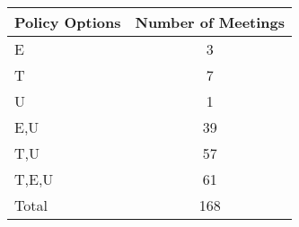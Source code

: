 \begin{tabular}{lc}
\hline\hline 
\addlinespace 
Policy Options & Number of Meetings \\ 
\hline 
E & 3 \\
T & 7 \\
U & 1 \\
E,U & 39 \\
T,U & 57 \\
T,E,U & 61 \\
\addlinespace 
Total & 168 \\
\hline 
\end{tabular}